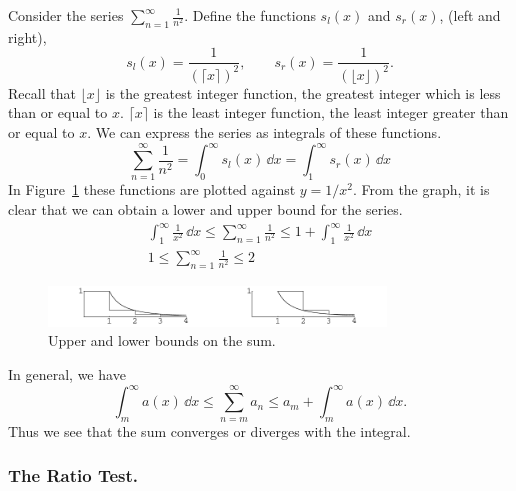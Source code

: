 
\begin{Example}
  Consider the series $\sum_{n=1}^\infty \frac{1}{n^2}$.  Define the functions
  $s_l(x)$ and $s_r(x)$, (left and right),
  \[ 
  s_l(x) = \frac{1}{\left( \lceil x \rceil \right)^2}, \qquad
  s_r(x) = \frac{1}{\left( \lfloor x \rfloor \right)^2}.
  \]
  Recall that $\lfloor x \rfloor$ is the greatest integer function, the greatest
  integer which is less than or equal to $x$.  $\lceil x \rceil$ is the least
  integer function, the least integer greater than or equal to $x$.
  We can express the series as integrals of these functions.
  \[ 
  \sum_{n=1}^\infty \frac{1}{n^2} = \int_0^\infty s_l(x)\,\dd x = \int_1^\infty s_r(x)\,\dd x
  \]
  In Figure~\ref{bound_series} these functions are plotted against $y = 1/x^2$.
  From the graph, it is clear that we can obtain a lower and upper bound
  for the series.
  \begin{gather*}
    \int_1^\infty \frac{1}{x^2}\,\dd x \leq \sum_{n=1}^\infty \frac{1}{n^2} \leq 1 + \int_1^\infty \frac{1}{x^2}\,\dd x 
    \\
    \boxed{ 
      1 \leq \sum_{n=1}^\infty \frac{1}{n^2} \leq 2 
      }
  \end{gather*}

  \begin{figure}[htb!]
    \begin{center}
      \includegraphics[width=0.8\textwidth]{fcv/series/bound}
      \caption{Upper and lower bounds on the sum.}
      \label{bound_series}
    \end{center}
  \end{figure}




\end{Example}

In general, we have
\[
\int_m^\infty a(x) \,\dd x \leq \sum_{n=m}^\infty a_n \leq a_m + \int_m^\infty a(x) \,\dd x.
\]
Thus we see that the sum converges or diverges with the integral.











\subsubsection{The Ratio Test.}



